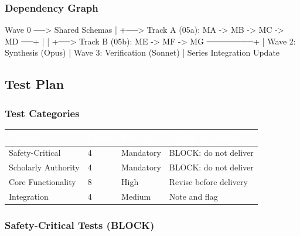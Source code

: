 \documentclass[11pt,letterpaper]{article}
\newcommand{\tableheader}[1]{\textbf{\sffamily\textcolor{white}{#1}}}
\begin{document}
\subsubsection{Dependency Graph}

\begin{asciibox}
Wave 0 ──> Shared Schemas
            |
            +──> Track A (05a): MA -> MB -> MC -> MD ──+
            |                                           |
            +──> Track B (05b): ME -> MF -> MG ────────+
                                                        |
                                               Wave 2: Synthesis (Opus)
                                                        |
                                               Wave 3: Verification (Sonnet)
                                                        |
                                               Series Integration Update
\end{asciibox}

\subsection{Test Plan}

\subsubsection{Test Categories}

\begin{center}
\begin{tabularx}{\textwidth}{L{3.5cm}C{1.5cm}L{2cm}X}
\toprule
{}
\tableheader{Category} & \tableheader{Count} & \tableheader{Priority} & \tableheader{Action on Failure} \\
\midrule
Safety-Critical & 4 & Mandatory & BLOCK: do not deliver \\
Scholarly Authority & 4 & Mandatory & BLOCK: do not deliver \\
Core Functionality & 8 & High & Revise before delivery \\
Integration & 4 & Medium & Note and flag \\
\bottomrule
\end{tabularx}
\end{center}

\subsubsection{Safety-Critical Tests (BLOCK)}
\end{document}
